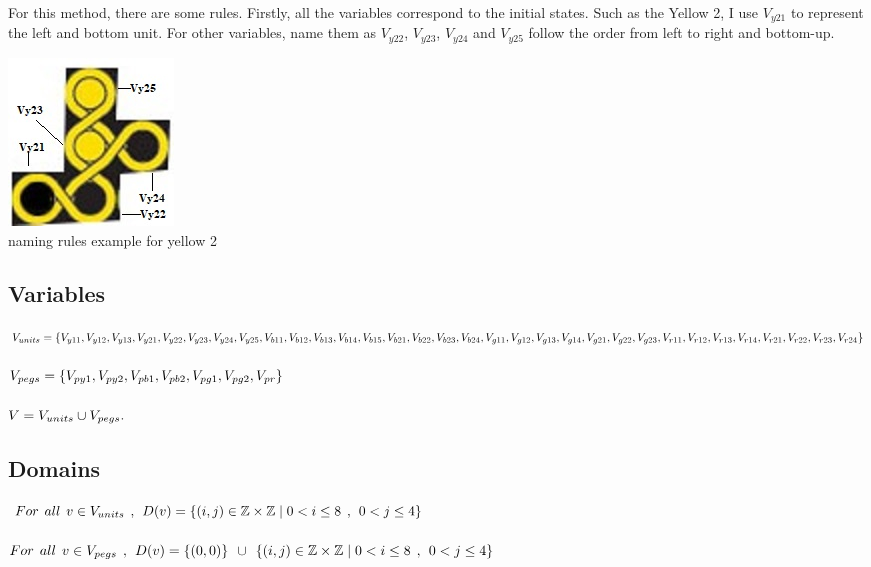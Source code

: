 For this method, there are some rules. Firstly, all the variables correspond to the initial states. Such as the Yellow 2, I use $V_{y21}$ to represent the left and bottom unit. For other variables, name them as $V_{y22}$, $V_{y23}$, $V_{y24}$ and $V_{y25}$ follow the order from left to right and bottom-up.
\begin{center}
\includegraphics{example.jpg}
\\naming rules example for yellow 2
\end{center}
\subsection{Variables}
$V_{units}=\{ V_{y11},V_{y12},
V_{y13},V_{y21},V_{y22},V_{y23},V_{y24},V_{y25},\\V_{b11},V_{b12},V_{b13},V_{b14},
V_{b15},V_{b21},V_{b22},V_{b23},\\V_{b24},V_{g11},V_{g12},V_{g13},V_{g14},V_{g21},V_{g22},V_{g23},\\V_{r11},
V_{r12},V_{r13},V_{r14},V_{r21},V_{r22},V_{r23},V_{r24}\}$\\
\\$V_{pegs} = \{V_{py1}, V_{py2}, V_{pb1}, V_{pb2}, V_{pg1}, V_{pg2}, V_{pr}\}$\\
\\$V = V_{units} \cup V_{pegs}.$
\subsection{Domains}
$For \hspace{1ex} all \hspace{1ex} v \in V_{units} \hspace{1ex},\hspace{1ex} D(v)=\{(i,j) \in \mathbb{Z} \times \mathbb{Z}	\mid  0<i \leq 8 \hspace{1ex} , \hspace{1ex} 0<j \leq 4\}$\\
\\
$For \hspace{1ex} all \hspace{1ex} v \in V_{pegs} \hspace{1ex},\hspace{1ex} D(v)=\{(0,0)\} \hspace{1ex} \cup \hspace{1ex}\{(i,j) \in \mathbb{Z} \times \mathbb{Z}\mid  0<i \leq 8 \hspace{1ex} , \hspace{1ex} 0<j \leq 4\}$
